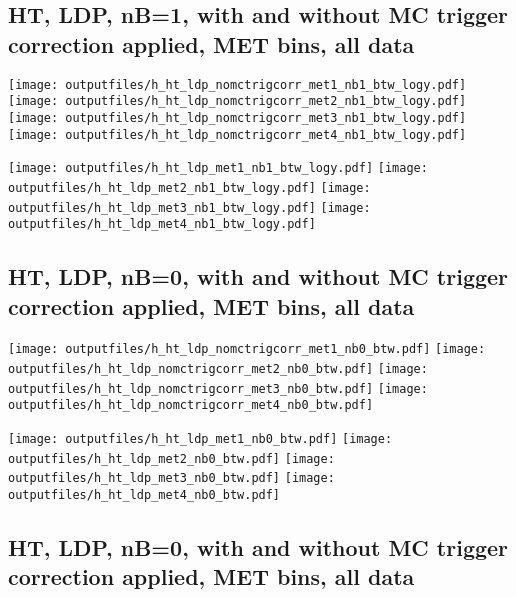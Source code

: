 \documentclass[11pt]{article}
\begin{document}
   \clearpage
     \subsection{ HT, LDP, nB=1, with and without MC trigger correction applied, MET bins, all data}

    \noindent
     \texttt{[image: outputfiles/h\_ht\_ldp\_nomctrigcorr\_met1\_nb1\_btw\_logy.pdf]}
     \texttt{[image: outputfiles/h\_ht\_ldp\_nomctrigcorr\_met2\_nb1\_btw\_logy.pdf]}
     \texttt{[image: outputfiles/h\_ht\_ldp\_nomctrigcorr\_met3\_nb1\_btw\_logy.pdf]}
     \texttt{[image: outputfiles/h\_ht\_ldp\_nomctrigcorr\_met4\_nb1\_btw\_logy.pdf]}

    \noindent
     \texttt{[image: outputfiles/h\_ht\_ldp\_met1\_nb1\_btw\_logy.pdf]}
     \texttt{[image: outputfiles/h\_ht\_ldp\_met2\_nb1\_btw\_logy.pdf]}
     \texttt{[image: outputfiles/h\_ht\_ldp\_met3\_nb1\_btw\_logy.pdf]}
     \texttt{[image: outputfiles/h\_ht\_ldp\_met4\_nb1\_btw\_logy.pdf]}

   \clearpage
     \subsection{ HT, LDP, nB=0, with and without MC trigger correction applied, MET bins, all data}

    \noindent
     \texttt{[image: outputfiles/h\_ht\_ldp\_nomctrigcorr\_met1\_nb0\_btw.pdf]}
     \texttt{[image: outputfiles/h\_ht\_ldp\_nomctrigcorr\_met2\_nb0\_btw.pdf]}
     \texttt{[image: outputfiles/h\_ht\_ldp\_nomctrigcorr\_met3\_nb0\_btw.pdf]}
     \texttt{[image: outputfiles/h\_ht\_ldp\_nomctrigcorr\_met4\_nb0\_btw.pdf]}

    \noindent
     \texttt{[image: outputfiles/h\_ht\_ldp\_met1\_nb0\_btw.pdf]}
     \texttt{[image: outputfiles/h\_ht\_ldp\_met2\_nb0\_btw.pdf]}
     \texttt{[image: outputfiles/h\_ht\_ldp\_met3\_nb0\_btw.pdf]}
     \texttt{[image: outputfiles/h\_ht\_ldp\_met4\_nb0\_btw.pdf]}

   \clearpage
     \subsection{ HT, LDP, nB=0, with and without MC trigger correction applied, MET bins, all data}
\end{document}
